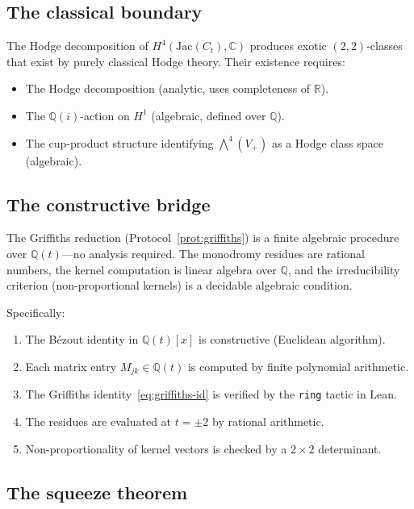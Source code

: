 \documentclass[11pt]{article}
\theoremstyle{plain}
\theoremstyle{definition}
\theoremstyle{remark}
\newcommand{\Q}{\mathbb{Q}}
\newcommand{\R}{\mathbb{R}}
\newcommand{\C}{\mathbb{C}}
\begin{document}
\subsection{The classical boundary}

The Hodge decomposition of $H^4(\mathrm{Jac}(C_t), \C)$ produces
exotic $(2,2)$-classes that exist by purely classical Hodge theory.
Their existence requires:
\begin{itemize}[nosep]
\item The Hodge decomposition (analytic, uses completeness of $\R$).
\item The $\Q(i)$-action on $H^1$ (algebraic, defined over $\Q$).
\item The cup-product structure identifying $\bigwedge^4(V_+)$ as
  a Hodge class space (algebraic).
\end{itemize}

\subsection{The constructive bridge}

The Griffiths reduction (Protocol~\ref{prot:griffiths}) is a finite
algebraic procedure over $\Q(t)$---no analysis required. The monodromy
residues are rational numbers, the kernel computation is linear algebra
over $\Q$, and the irreducibility criterion (non-proportional kernels)
is a decidable algebraic condition.

Specifically:
\begin{enumerate}[nosep]
\item The B\'ezout identity in $\Q(t)[x]$ is constructive (Euclidean
  algorithm).
\item Each matrix entry $M_{jk} \in \Q(t)$ is computed by finite
  polynomial arithmetic.
\item The Griffiths identity~\eqref{eq:griffiths-id} is verified by
  the \texttt{ring} tactic in Lean.
\item The residues are evaluated at $t = \pm 2$ by rational arithmetic.
\item Non-proportionality of kernel vectors is checked by a $2 \times 2$
  determinant.
\end{enumerate}

\subsection{The squeeze theorem}
\end{document}
